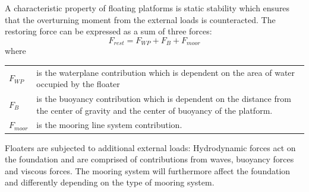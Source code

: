 A characteristic property of floating platforms is static stability which ensures that the overturning moment from the external loads is counteracted. The restoring force can be expressed as a sum of three forces:
\begin{equation} \label{eq:F_rest}
	F_{rest} = F_{WP} + F_B + F_{moor}
\end{equation}
where \smallskip 
\begin{center}
	\begin{tabular}{l p{12cm}}
		$ F_{WP} $ & is the waterplane contribution which is dependent on the area of water occupied by the floater\\
		$ F_{B} $ & is the buoyancy contribution which is dependent on the distance from the center of gravity and the center of buoyancy of the platform.\\
		$ F_{moor} $ & is the mooring line system contribution.
	\end{tabular}
\end{center} \smallskip
Floaters are subjected to additional external loads: Hydrodynamic forces act on the foundation and are comprised of contributions from waves, buoyancy forces and viscous forces. The mooring system will furthermore affect the foundation and differently depending on the type of mooring system.\\

